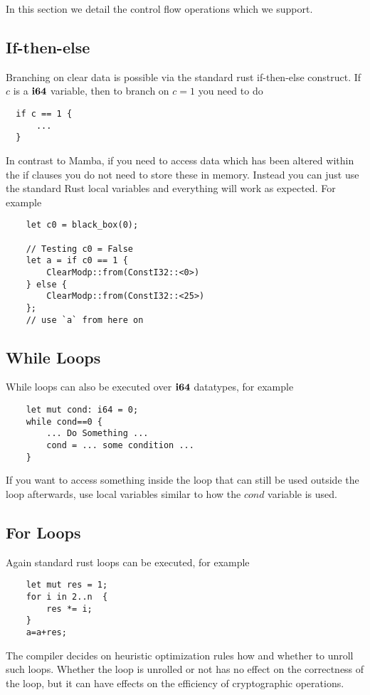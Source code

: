 In this section we detail the control flow operations which we
support.

\subsection{If-then-else}
Branching on clear data is possible via the standard
rust if-then-else construct.
If $c$ is a $\mathbf{i64}$ variable, then to branch on $c=1$
you need to do
\begin{lstlisting}
  if c == 1 {
	  ...
  }
\end{lstlisting}
In contrast to Mamba, if you need to access data which has been 
altered within the if clauses you do not need to store these in 
memory.
Instead you can just use the standard Rust local variables
and everything will work as expected.
For example
\begin{lstlisting}
    let c0 = black_box(0);

    // Testing c0 = False
    let a = if c0 == 1 {
        ClearModp::from(ConstI32::<0>)
    } else {
        ClearModp::from(ConstI32::<25>)
    };
    // use `a` from here on
\end{lstlisting}

\subsection{While Loops}
While loops can also be executed over $\mathbf{i64}$ datatypes, for
example
\begin{lstlisting}
    let mut cond: i64 = 0;
    while cond==0 {
        ... Do Something ...
        cond = ... some condition ...
    }
\end{lstlisting}
If you want to access something inside the loop that can still be
used outside the loop afterwards, use local variables similar to
how the $cond$ variable is used.

\subsection{For Loops}
Again standard rust loops can be executed, for example
\begin{lstlisting}
    let mut res = 1;
    for i in 2..n  {
        res *= i;
    }
    a=a+res;
\end{lstlisting}
The compiler decides on heuristic optimization rules how and whether
to unroll such loops. Whether the loop is unrolled or not has no
effect on the correctness of the loop, but it can have effects on
the efficiency of cryptographic operations.

